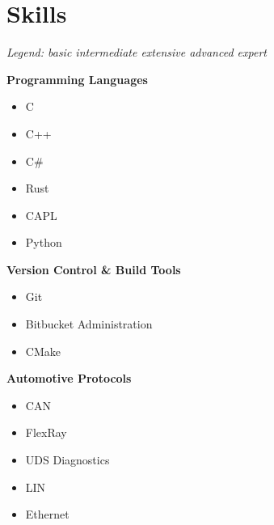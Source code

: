 \section*{Skills}

{\small\textit{Legend:  basic \quad {} intermediate \quad {} extensive \quad {} advanced \quad {} expert}}

\vspace{0.75em}

\begin{minipage}[t]{0.48\textwidth}
\textbf{Programming Languages}
\begin{itemize}[leftmargin=*,noitemsep,topsep=0pt]
    \item C 
    \item C++ 
    \item C\# 
    \item Rust 
    \item CAPL 
    \item Python 
\end{itemize}

\vspace{0.5em}

\textbf{Version Control \& Build Tools}
\begin{itemize}[leftmargin=*,noitemsep,topsep=0pt]
    \item Git 
    \item Bitbucket Administration 
    \item CMake 
\end{itemize}

\vspace{0.5em}

\textbf{Automotive Protocols}
\begin{itemize}[leftmargin=*,noitemsep,topsep=0pt]
    \item CAN 
    \item FlexRay 
    \item UDS Diagnostics 
    \item LIN 
    \item Ethernet 
\end{itemize}


\end{minipage}
